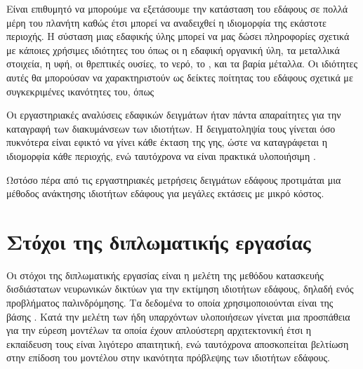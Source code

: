Είναι επιθυμητό να μπορούμε να εξετάσουμε την κατάσταση του εδάφους σε πολλά μέρη του πλανήτη καθώς έτσι μπορεί να αναδειχθεί η ιδιομορφία της εκάστοτε περιοχής. Η σύσταση μιας εδαφικής ύλης μπορεί να μας δώσει πληροφορίες σχετικά με κάποιες χρήσιμες ιδιότητες του όπως οι η εδαφική οργανική ύλη, τα μεταλλικά στοιχεία, η υφή, οι θρεπτικές ουσίες, το νερό, το , και τα βαρία μέταλλα. Οι ιδιότητες αυτές θα μπορούσαν να χαρακτηριστούν ως δείκτες ποίτητας του εδάφους σχετικά με συγκεκριμένες ικανότητες του, όπως

Οι εργαστηριακές αναλύσεις εδαφικών δειγμάτων ήταν πάντα απαραίτητες για την καταγραφή των διακυμάνσεων των ιδιοτήτων. Η δειγματοληψία τους γίνεται όσο πυκνότερα είναι εφικτό να γίνει κάθε έκταση της γης, ώστε να καταγράφεται η ιδιομορφία κάθε περιοχής, ενώ ταυτόχρονα να είναι πρακτικά υλοποιήσιμη \cite{soil_spectr}.

Ωστόσο πέρα από τις εργαστηριακές μετρήσεις δειγμάτων εδάφους προτιμάται μια μέθοδος ανάκτησης ιδιοτήτων εδάφους για μεγάλες εκτάσεις με μικρό κόστος.

\section{Στόχοι της διπλωματικής εργασίας}
Οι στόχοι της διπλωματικής εργασίας είναι η μελέτη της μεθόδου κατασκευής δισδιάστατων νευρωνικών δικτύων για την εκτίμηση ιδιοτήτων εδάφους, δηλαδή ενός προβλήματος παλινδρόμησης. Τα δεδομένα το οποία χρησιμοποιούνται είναι της βάσης  \cite{lucas_soil}. Κατά την μελέτη των ήδη υπαρχόντων υλοποιήσεων γίνεται μια προσπάθεια για την εύρεση μοντέλων τα οποία έχουν απλούστερη αρχιτεκτονική έτσι η εκπαίδευση τους είναι λιγότερο απαιτητική, ενώ ταυτόχρονα αποσκοπείται βελτίωση στην επίδοση του μοντέλου στην ικανότητα πρόβλεψης των ιδιοτήτων εδάφους. 

